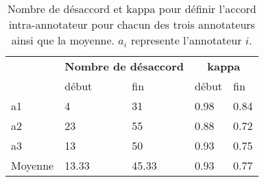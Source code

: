 \begin{table}[th]
  \centering
  \begin{tabular}{|p{1cm}| l l | l l|}
    \hline
        &\multicolumn{2}{c}{\textbf{Nombre de désaccord}} & \multicolumn{2}{c}{\textbf{kappa}} \\
              &début  &fin    &début      &fin  \\
    \hline
    a1        &4      &31     &0.98       &0.84	\\
    a2        &23     &55     &0.88       &0.72 \\
    a3        &13     &50     &0.93       &0.75	\\
    \hline
    Moyenne  &13.33 &45.33 &0.93   &0.77 \\
    \hline
  \end{tabular}
\caption{Nombre de désaccord et kappa pour définir l'accord intra-annotateur pour chacun des trois annotateurs ainsi que la moyenne. $a_i$ represente l'annotateur $i$.}
\label{tab:accordIntraAnnot}
\end{table}
